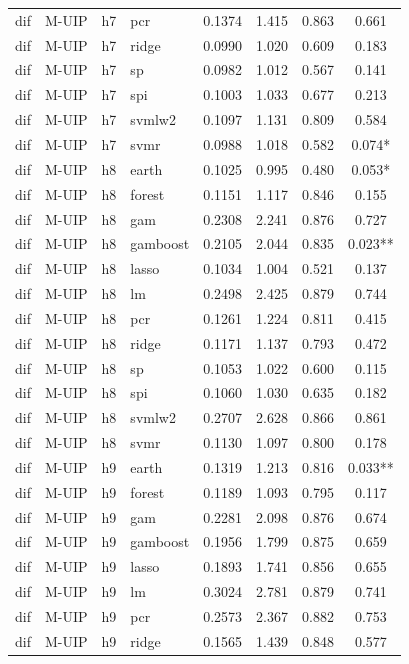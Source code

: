 \begin{ThreePartTable}
\begin{longtable}[t]{llclcccc}
dif & M-UIP & h7 & pcr & 0.1374 & 1.415 & 0.863 & 0.661\\
dif & M-UIP & h7 & ridge & 0.0990 & 1.020 & 0.609 & 0.183\\
dif & M-UIP & h7 & sp & 0.0982 & 1.012 & 0.567 & 0.141\\
dif & M-UIP & h7 & spi & 0.1003 & 1.033 & 0.677 & 0.213\\
dif & M-UIP & h7 & svmlw2 & 0.1097 & 1.131 & 0.809 & 0.584\\
dif & M-UIP & h7 & svmr & 0.0988 & 1.018 & 0.582 & 0.074*\\
\addlinespace
dif & M-UIP & h8 & earth & 0.1025 & 0.995 & 0.480 & 0.053*\\
dif & M-UIP & h8 & forest & 0.1151 & 1.117 & 0.846 & 0.155\\
dif & M-UIP & h8 & gam & 0.2308 & 2.241 & 0.876 & 0.727\\
dif & M-UIP & h8 & gamboost & 0.2105 & 2.044 & 0.835 & 0.023**\\
dif & M-UIP & h8 & lasso & 0.1034 & 1.004 & 0.521 & 0.137\\
dif & M-UIP & h8 & lm & 0.2498 & 2.425 & 0.879 & 0.744\\
dif & M-UIP & h8 & pcr & 0.1261 & 1.224 & 0.811 & 0.415\\
dif & M-UIP & h8 & ridge & 0.1171 & 1.137 & 0.793 & 0.472\\
dif & M-UIP & h8 & sp & 0.1053 & 1.022 & 0.600 & 0.115\\
dif & M-UIP & h8 & spi & 0.1060 & 1.030 & 0.635 & 0.182\\
dif & M-UIP & h8 & svmlw2 & 0.2707 & 2.628 & 0.866 & 0.861\\
dif & M-UIP & h8 & svmr & 0.1130 & 1.097 & 0.800 & 0.178\\
\addlinespace
dif & M-UIP & h9 & earth & 0.1319 & 1.213 & 0.816 & 0.033**\\
dif & M-UIP & h9 & forest & 0.1189 & 1.093 & 0.795 & 0.117\\
dif & M-UIP & h9 & gam & 0.2281 & 2.098 & 0.876 & 0.674\\
dif & M-UIP & h9 & gamboost & 0.1956 & 1.799 & 0.875 & 0.659\\
dif & M-UIP & h9 & lasso & 0.1893 & 1.741 & 0.856 & 0.655\\
dif & M-UIP & h9 & lm & 0.3024 & 2.781 & 0.879 & 0.741\\
dif & M-UIP & h9 & pcr & 0.2573 & 2.367 & 0.882 & 0.753\\
dif & M-UIP & h9 & ridge & 0.1565 & 1.439 & 0.848 & 0.577\\

\end{longtable}
\end{ThreePartTable}
